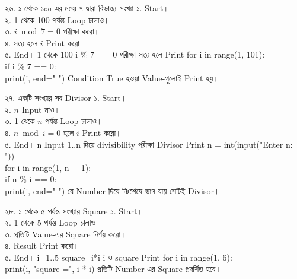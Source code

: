 \exerciseTable
{২৬. ১ থেকে ১০০-এর মধ্যে ৭ দ্বারা বিভাজ্য সংখ্যা}
{
১. Start।\\
২. 1 থেকে 100 পর্যন্ত Loop চালাও।\\
৩. \(i\bmod7=0\) পরীক্ষা করো।\\
৪. সত্য হলে \(i\) Print করো।\\
৫. End।
}
{
\linearflow
{1 থেকে 100}
{i \% 7 == 0 পরীক্ষা}
{সত্য হলে Print}
}
{
for i in range(1, 101):\\
\hspace*{4mm}if i \% 7 == 0:\\
\hspace*{8mm}print(i, end=" ")
}
{
Condition True হওয়া Value-গুলোই Print হয়।
}


\exerciseTable
{২৭. একটি সংখ্যার সব Divisor}
{
১. Start।\\
২. \(n\) Input নাও।\\
৩. 1 থেকে \(n\) পর্যন্ত Loop চালাও।\\
৪. \(n\bmod i=0\) হলে \(i\) Print করো।\\
৫. End।
}
{
\linearflow
{n Input}
{1..n দিয়ে divisibility পরীক্ষা}
{Divisor Print}
}
{
n = int(input("Enter n: "))\\
for i in range(1, n + 1):\\
\hspace*{4mm}if n \% i == 0:\\
\hspace*{8mm}print(i, end=" ")
}
{
যে Number দিয়ে নিঃশেষে ভাগ যায় সেটিই Divisor।
}


\exerciseTable
{২৮. ১ থেকে ৫ পর্যন্ত সংখ্যার Square}
{
১. Start।\\
২. 1 থেকে 5 পর্যন্ত Loop চালাও।\\
৩. প্রতিটি Value-এর Square নির্ণয় করো।\\
৪. Result Print করো।\\
৫. End।
}
{
\linearflow
{i=1..5}
{square=i*i}
{i ও square Print}
}
{
for i in range(1, 6):\\
\hspace*{4mm}print(i, "square =", i * i)
}
{
প্রতিটি Number-এর Square প্রদর্শিত হবে।
}


